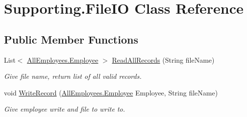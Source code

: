 \hypertarget{class_supporting_1_1_file_i_o}{}\section{Supporting.\+File\+I\+O Class Reference}
\label{class_supporting_1_1_file_i_o}
\subsection*{Public Member Functions}
\begin{DoxyCompactItemize}
\item 
List$<$ \hyperlink{class_all_employees_1_1_employee}{All\+Employees.\+Employee} $>$ \hyperlink{class_supporting_1_1_file_i_o_ab33154b7acbb27ecaee49cfe701691e7}{Read\+All\+Records} (String file\+Name)
\begin{DoxyCompactList}\small\item\em Give file name, return list of all valid records. \end{DoxyCompactList}\item 
void \hyperlink{class_supporting_1_1_file_i_o_a23293f70ec655e87ea568ffada174b9f}{Write\+Record} (\hyperlink{class_all_employees_1_1_employee}{All\+Employees.\+Employee} Employee, String file\+Name)
\begin{DoxyCompactList}\small\item\em Give employee write and file to write to. \end{DoxyCompactList}\end{DoxyCompactItemize}
